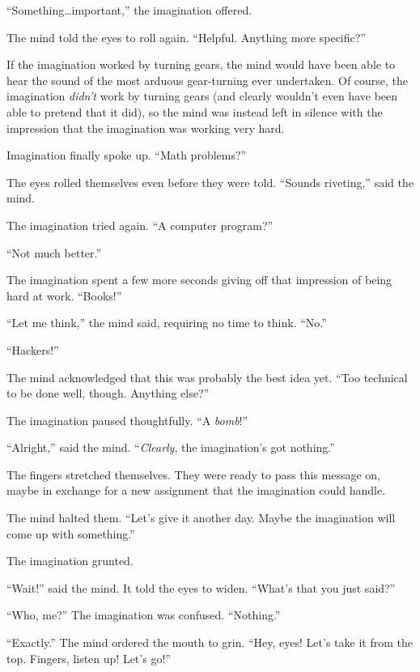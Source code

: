 \documentclass[10pt]{article}
\begin{document}
``Something\ldots important,'' the imagination offered.

The mind told the eyes to roll again. ``Helpful. Anything more
specific?''

If the imagination worked by turning gears, the mind would have been
able to hear the sound of the most arduous gear-turning ever undertaken.
Of course, the imagination \emph{didn't} work by turning gears (and
clearly wouldn't even have been able to pretend that it did), so the
mind was instead left in silence with the impression that the
imagination was working very hard.

Imagination finally spoke up. ``Math problems?''

The eyes rolled themselves even before they were told.
``Sounds riveting,'' said the mind.

The imagination tried again. ``A computer program?''

``Not much better.''

The imagination spent a few more seconds giving off that impression of
being hard at work. ``Books!''

``Let me think,'' the mind said, requiring no time to think. ``No.''

``Hackers!''

The mind acknowledged that this was probably the best idea yet.  ``Too
technical to be done well, though.  Anything else?''

The imagination paused thoughtfully.  ``A \emph{bomb}!''

``Alright,'' said the mind. ``\emph{Clearly}, the imagination's got
nothing.''

The fingers stretched themselves.  They were ready to pass this message
on, maybe in exchange for a new assignment that the imagination could
handle.

The mind halted them. ``Let's give it another day.  Maybe the
imagination will come up with something.''

The imagination grunted.

``Wait!'' said the mind.  It told the eyes to widen. ``What's that you
just said?''

``Who, me?'' The imagination was confused. ``Nothing.''

``Exactly.'' The mind ordered the mouth to grin. ``Hey, eyes!  Let's take
it from the top.  Fingers, listen up!  Let's go!''
\end{document}
